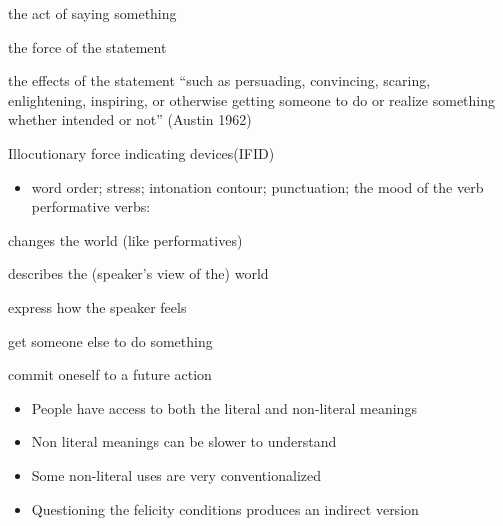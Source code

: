 \documentclass[headrule,footrule]{foils}
\begin{document}
\begin{description}
\item {} the act of saying something
\item {} the force of the statement 
\item {} the effects of the statement
``such as persuading, convincing, scaring, enlightening, inspiring, or otherwise getting someone to do or realize something whether intended or not'' (Austin 1962)
\end{description}
Illocutionary force indicating devices(IFID)
\begin{itemize}
\item   word order;  stress;    intonation contour;  punctuation; the mood of the verb
 performative verbs:  
\end{itemize}

  \begin{description}
  \item {} changes the world (like performatives)
  \item {} describes the (speaker's view of the) world 
  \item {}  express how the speaker feels
  \item {} get someone else to do something
  \item {} commit oneself to a future action
  \end{description}



\begin{exe}
  \ex
  \begin{xlist}
    \ex {} 
    \ex {}
  \end{xlist}
  \ex 
  \begin{xlist}
    \ex {}
    \ex {}
  \end{xlist}
  \ex
  \begin{xlist}
    \ex {}
    \ex {}
  \end{xlist}
\end{exe}
\begin{itemize}
\item People have access to both the literal and non-literal meanings
\item Non literal meanings can be slower to understand
\item Some non-literal uses are very conventionalized 
  \\  \into {}
\item Questioning the felicity conditions produces an indirect version
\end{itemize}
\end{document}
